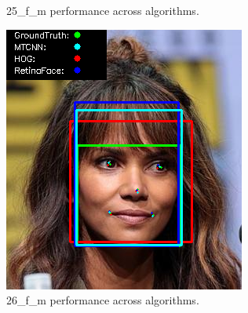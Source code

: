 \documentclass{l4proj}
\begin{document}
\begin{appendices}
\begin{figure}[h!]
\begin{minipage}{0.49\textwidth}
    \caption{25\_f\_m performance across algorithms.}
    \label{whoopi_result}
  \end{minipage}
\end{figure}

\begin{figure}[h!]
  \centering
  \begin{minipage}{0.49\textwidth}
    \centering
     \includegraphics[width=\textwidth]{images/appendix/26.png}
    \caption{26\_f\_m performance across algorithms.}
    \label{whoopi_result}
  \end{minipage}
    \hfill
    \begin{minipage}{0.49\textwidth}
    \centering

\end{minipage}
\end{figure}
\end{appendices}
\end{document}
